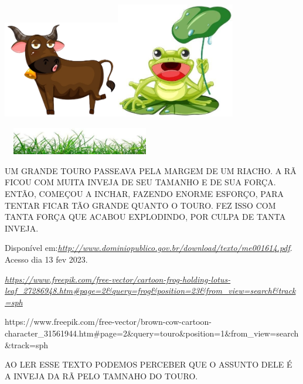 \includegraphics[width=2.01214in,height=1.68750in]{media/image160.png}\includegraphics[width=2.04167in,height=1.99274in]{media/image161.jpg}

\includegraphics[width=2.66528in,height=0.47292in]{media/image162.jpg}

UM GRANDE TOURO PASSEAVA PELA MARGEM DE UM RIACHO. A RÃ FICOU COM MUITA
INVEJA DE SEU TAMANHO E DE SUA FORÇA. ENTÃO, COMEÇOU A INCHAR, FAZENDO
ENORME ESFORÇO, PARA TENTAR FICAR TÃO GRANDE QUANTO O TOURO. FEZ ISSO
COM TANTA FORÇA QUE ACABOU EXPLODINDO, POR CULPA DE TANTA INVEJA.

Disponível
em:\href{http://www.dominiopublico.gov.br/download/texto/me001614.pdf}{\emph{http://www.dominiopublico.gov.br/download/texto/me001614.pdf}}.
Acesso dia 13 fev 2023.

\href{https://www.freepik.com/free-vector/cartoon-frog-holding-lotus-leaf_27286948.htm\#page=2\&query=frog\&position=23\&from_view=search\&track=sph}{\emph{https://www.freepik.com/free-vector/cartoon-frog-holding-lotus-leaf\_27286948.htm\#page=2\&query=frog\&position=23\&from\_view=search\&track=sph}}

https://www.freepik.com/free-vector/brown-cow-cartoon-character\_31561944.htm\#page=2\&query=touro\&position=1\&from\_view=search\&track=sph

AO LER ESSE TEXTO PODEMOS PERCEBER QUE O ASSUNTO DELE É A INVEJA DA RÃ
PELO TAMNAHO DO TOURO.

